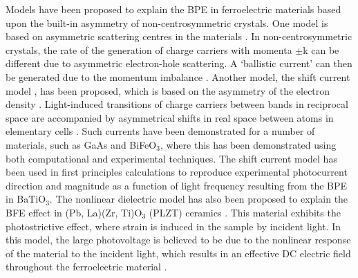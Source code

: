 Models have been proposed to explain the BPE in ferroelectric materials based upon the built-in asymmetry of non-centrosymmetric crystals. One model is based on asymmetric scattering centres in the materials \cite{PGE}. In non-centrosymmetric crystals, the rate of the generation of charge carriers with momenta $\pm$k can be different due to asymmetric electron-hole scattering. A `ballistic current' can then be generated due to the momentum imbalance \cite{shift_current}.
Another model, the shift current model \cite{shift_current}, has been proposed, which is based on the asymmetry of the electron density \cite{keith}.
Light-induced transitions of charge carriers between bands in reciprocal space are accompanied by asymmetrical shifts in real space between atoms in elementary cells \cite{shift_current}.
Such currents have been demonstrated for a number of materials, such as GaAs \cite{keith_52} and BiFeO$_3$, where this has been demonstrated using both computational \cite{keith_25} and experimental \cite{keith_51} techniques. The shift current model has been used in first principles calculations to reproduce experimental photocurrent direction and magnitude as a function of light frequency resulting from the BPE in BaTiO$_3$\cite{Rappe}. 
The nonlinear dielectric model has also been proposed to explain the BFE effect in (Pb, La)(Zr, Ti)O$_{3}$ (PLZT) ceramics \cite{nonlinear_dielectric}. This material exhibits the photostrictive effect, where strain is induced in the sample by incident light. In this model, the large photovoltage is believed to be due to the nonlinear response of the material to the incident light, which results in an effective DC electric field throughout the ferroelectric material \cite{FE_PV_rev1}.\\

